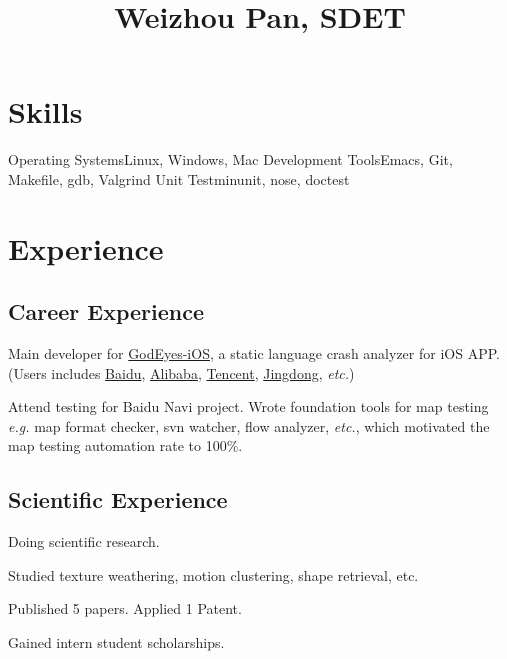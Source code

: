 \documentclass[11pt,a4paper,nolmodern]{moderncv}
\title{Weizhou Pan, SDET}
\begin{document}
\setmainfont{Minion Pro}
\setsansfont{Myriad Pro}

\maketitle

\section{Skills}

           {Operating Systems}{Linux, Windows, Mac}
           {Development Tools}{Emacs, Git, Makefile, gdb, Valgrind}
           {Unit Test}{minunit, nose, doctest}

\section{Experience}

\subsection{Career Experience}

{
\begin{tightitemize}%
 \item Main developer for \href{http://godeyes.duapp.com}{GodEyes-iOS}, a static
   language crash analyzer for iOS APP. (Users includes \href{http://www.baidu.com}{Baidu},
   \href{http://www.taobao.com}{Alibaba}, \href{http://www.qq.com}{Tencent}, \href{http://jd.com}{Jingdong}, \textsl{etc.})
 \item Attend testing for Baidu Navi project. Wrote foundation tools for
   map testing \textsl{e.g.} map format checker, svn
   watcher, flow analyzer, \textsl{etc.}, which motivated
   the map testing automation rate to 100\%.
 \end{tightitemize}}

\subsection{Scientific Experience}

{Doing scientific research.
\begin{tightitemize}%
 \item Studied texture weathering, motion clustering, shape retrieval, etc.
 \item Published 5 papers. Applied 1 Patent.
 \item Gained intern student scholarships. 
 \end{tightitemize}}
\end{document}
